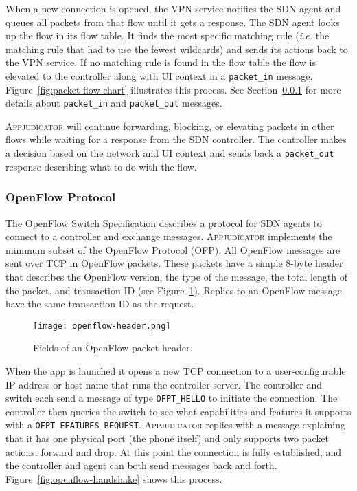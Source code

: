 When a new connection is opened, the VPN service notifies the SDN agent and
queues all packets from that flow until it gets a response. The SDN agent looks
up the flow in its flow table. It finds the most specific matching rule
(\textit{i.e.} the matching rule that had to use the fewest wildcards) and sends
its actions back to the VPN service. If no matching rule is found in the flow
table the flow is elevated to the controller along with UI context in a
\texttt{packet\_in} message. Figure~\ref{fig:packet-flow-chart} illustrates this
process. See Section~\ref{sec:openflow-protocol} for more details about
\texttt{packet\_in} and \texttt{packet\_out} messages.

\textsc{Appjudicator} will continue forwarding, blocking, or elevating packets
in other flows while waiting for a response from the SDN controller. The
controller makes a decision based on the network and UI context and sends back a
\texttt{packet\_out} response describing what to do with the flow.

\subsubsection{OpenFlow Protocol}
\label{sec:openflow-protocol}

The OpenFlow Switch Specification describes a protocol for SDN agents to connect
to a controller and exchange messages. \textsc{Appjudicator} implements the
minimum subset of the OpenFlow Protocol (OFP). All OpenFlow messages are sent
over TCP in OpenFlow packets. These packets have a simple 8-byte header that
describes the OpenFlow version, the type of the message, the total length of the
packet, and transaction ID (see Figure~\ref{fig:openflow-header}). Replies to an
OpenFlow message have the same transaction ID as the request.

\begin{figure}[h]
    \centering
    \texttt{[image: openflow-header.png]}
    \caption{Fields of an OpenFlow packet header.}
    \label{fig:openflow-header}
\end{figure}

When the app is launched it opens a new TCP connection to a user-configurable IP
address or host name that runs the controller server. The controller and switch
each send a message of type \texttt{OFPT\_HELLO} to initiate the connection. The
controller then queries the switch to see what capabilities and features it
supports with a \texttt{OFPT\_FEATURES\_REQUEST}. \textsc{Appjudicator} replies
with a message explaining that it has one physical port (the phone itself) and
only supports two packet actions: forward and drop. At this point the connection
is fully established, and the controller and agent can both send messages back
and forth. Figure~\ref{fig:openflow-handshake} shows this process.

